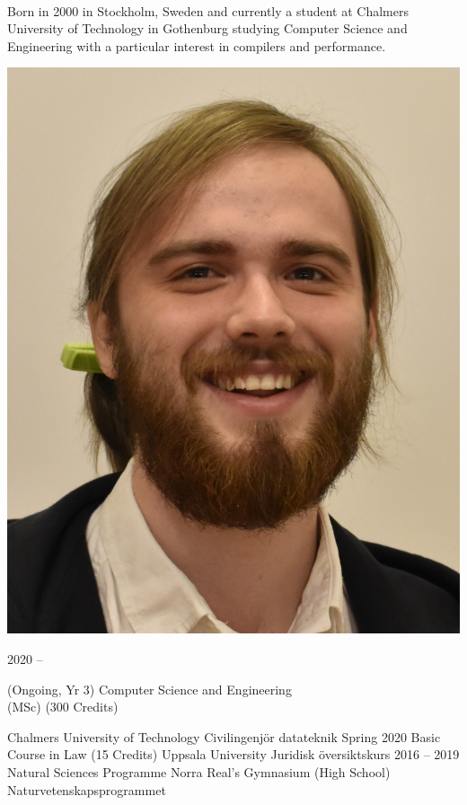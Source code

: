 \documentclass[9pt]{developercv}
\begin{document}
\begin{minipage}[t]{0.7\textwidth}
	\vspace{-\baselineskip}
	\\Born in 2000 in Stockholm, Sweden and currently a student at Chalmers
	University of Technology in Gothenburg studying Computer Science and
	Engineering with a particular interest in compilers and performance.
\end{minipage}
\hfill
\begin{minipage}[t]{0.2\textwidth}
	\vspace{-\baselineskip}
	\includegraphics[width=\linewidth]{smaller.png}
\end{minipage}
\begin{entrylist}
	\entry
		{2020 -- }
		{
			\begin{minipage}[t]{0.5\textwidth}
				(Ongoing, Yr 3) Computer Science and Engineering \\ (MSc) (300 Credits)
			\end{minipage}
		}
		{Chalmers University of Technology}
		{Civilingenjör datateknik}
	\entry
		{Spring 2020}
		{Basic Course in Law (15 Credits)}
		{Uppsala University}
		{Juridisk översiktskurs}
	\entry
		{2016 -- 2019}
		{Natural Sciences Programme}
		{Norra Real's Gymnasium (High School)}
		{Naturvetenskapsprogrammet}
\end{entrylist}
\end{document}

